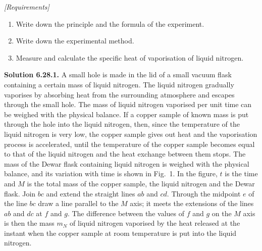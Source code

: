 \noindent\textit{[Requirements]}
\begin{enumerate}[label=(\arabic*),leftmargin=2.2em,itemsep=1pt,topsep=2pt]
\item Write down the principle and the formula of the experiment.
\item Write down the experimental method.
\item Measure and calculate the specific heat of vaporisation of liquid nitrogen.
\end{enumerate}

\medskip
\noindent\textbf{Solution 6.28.}\quad \textbf{1.} A small hole is made in the lid of a small vacuum flask containing a certain mass of liquid nitrogen. The liquid nitrogen gradually vaporises by absorbing heat from the surrounding atmosphere and escapes through the small hole. The mass of liquid nitrogen vaporised per unit time can be weighed with the physical balance. If a copper sample of known mass is put through the hole into the liquid nitrogen, then, since the temperature of the liquid nitrogen is very low, the copper sample gives out heat and the vaporisation process is accelerated, until the temperature of the copper sample becomes equal to that of the liquid nitrogen and the heat exchange between them stops. The mass of the Dewar flask containing liquid nitrogen is weighed with the physical balance, and its variation with time is shown in Fig.~1. In the figure, $t$ is the time and $M$ is the total mass of the copper sample, the liquid nitrogen and the Dewar flask. Join $bc$ and extend the straight lines $ab$ and $cd$. Through the midpoint $e$ of the line $bc$ draw a line parallel to the $M$ axis; it meets the extensions of the lines $ab$ and $dc$ at $f$ and $g$. The difference between the values of $f$ and $g$ on the $M$ axis is then the mass $m_N$ of liquid nitrogen vaporised by the heat released at the instant when the copper sample at room temperature is put into the liquid nitrogen.


